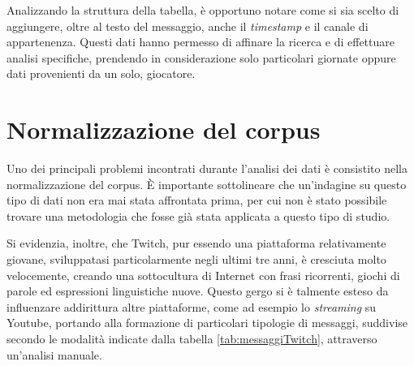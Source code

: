 \documentclass[a4paper,12pt,openright,twoside]{report}
\theoremstyle{definition}
\begin{document}
Analizzando la struttura della tabella, è opportuno notare come si sia scelto di aggiungere, 
oltre al testo del messaggio, anche 
il \emph{timestamp} e il canale di appartenenza. Questi dati hanno permesso di 
affinare la ricerca e di effettuare analisi
specifiche, prendendo in considerazione
solo particolari giornate oppure dati provenienti da un solo, giocatore.

\section{Normalizzazione del corpus}
Uno dei principali problemi incontrati durante l’analisi dei dati è consistito 
nella normalizzazione del corpus.  \`E importante sottolineare che 
un'indagine su questo tipo di dati non era mai 
stata affrontata prima, per cui non è stato possibile trovare una metodologia
che fosse già stata applicata a questo tipo di studio.

Si evidenzia, inoltre, che Twitch, pur essendo una piattaforma relativamente giovane, 
sviluppatasi particolarmente negli ultimi tre anni, 
è cresciuta molto velocemente, creando una sottocultura di Internet con frasi 
ricorrenti, giochi di parole ed espressioni linguistiche nuove. 
Questo gergo si è talmente esteso da influenzare addirittura altre piattaforme, 
come ad esempio lo \emph{streaming} su Youtube, portando 
alla formazione di particolari tipologie di messaggi, 
suddivise secondo le modalità indicate dalla tabella \ref{tab:messaggiTwitch},  attraverso un'analisi manuale.
\end{document}
